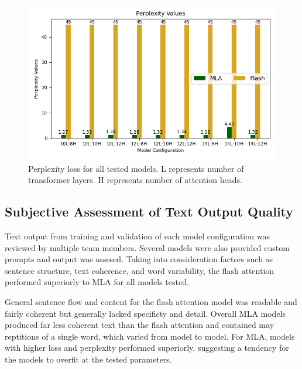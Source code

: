 \begin{figure}[H]
    \centering
    \includegraphics[width=\linewidth]{sections/images/perplexity.png}
    \caption{Perplexity loss for all tested models. L represents number of transformer layers. H represents number of attention heads.}
    \label{perplexity}
\end{figure}

\subsection{Subjective Assessment of Text Output Quality}
Text output from training and validation of each model configuration was reviewed by multiple team members. 
Several models were also provided custom prompts and output was assesed.
Taking into consideration factors such as sentence structure, text coherence, and word variability, the flash attention performed superiorly to MLA for all models tested\n.

General sentence flow and content for the flash attention model was readable and fairly coherent but generally lacked specificty and detail.  
Overall MLA models produced far less coherent text than the flash attention and contained may reptitions of a single word, which varied from model to model.
For MLA, models with higher loss and perplexity performed superiorly, suggesting a tendency for the models to overfit at the tested parameters.